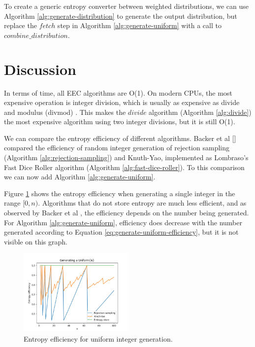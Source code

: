 \documentclass[12pt]{article}
\begin{document}
To create a generic entropy converter between weighted distributions, we can use Algorithm \ref{alg:generate-distribution} to generate the output distribution, but replace the $fetch$ step in Algorithm \ref{alg:generate-uniform} with a call to $combine\_distribution$.







\section {Discussion}

In terms of time, all EEC algorithms are O(1). On modern CPUs, the most expensive operation is integer division, which is usually as expensive as divide and modulus (divmod) \cite{cpudivmod}. This makes the $divide$ algorithm (Algorithm \ref{alg:divide}) the most expensive algorithm using two integer divisions, but it is still O(1).




We can compare the entropy efficiency of different algorithms. Backer et al [] compared the efficiency of random integer generation of rejection sampling (Algorithm \ref{alg:rejection-sampling}) and Knuth-Yao, implemented as Lombraso's Fast Dice Roller algorithm (Algorithm \ref{alg:fast-dice-roller}). To this comparison we can now add Algorithm \ref{alg:generate-uniform}.

Figure \ref{fig:uniform} shows the entropy efficiency when generating a single integer in the range $[0,n)$.  Algorithms that do not store entropy are much less efficient, and as observed by Backer et al \cite{todo}, the efficiency depends on the number being generated. For Algorithm \ref{alg:generate-uniform}, efficiency does decrease with the number generated according to Equation \ref{eq:generate-uniform-efficiency}, but it is not visible on this graph.

\begin{figure}[ht]
\centering
\includegraphics[width=0.5\textwidth]{uniform_efficiency.png}
\caption{Entropy efficiency for uniform integer generation.}
\label{fig:uniform}
\end{figure}
\end{document}
